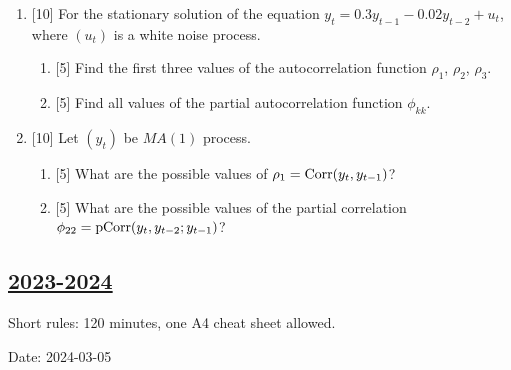 \begin{enumerate}
    \begin{enumerate}
        \item {[5]} Find 95\% confidence for $y_{101}$ given that $y_{100} = 3$ and $y_{99} = 4$.
        \item {[5]} Find 95\% confidence for $y_{102}$ given that $y_{100} = 3$ and $y_{99} = 4$.
    \end{enumerate}
    \item {[10]} For the stationary solution of the equation $y_t = 0.3 y_{t-1} - 0.02 y_{t-2} + u_t$, 
    where $(u_t)$ is a white noise process. 
    \begin{enumerate}
        \item {[5]} Find the first three values of the autocorrelation function $\rho_1$, $\rho_2$, $\rho_3$.
        \item {[5]} Find all values of the partial autocorrelation function $\phi_{kk}$.
    \end{enumerate}

    \item {[10]} Let $(y_t)$ be $MA(1)$ process. 
    \begin{enumerate}
        \item {[5]} What are the possible values of $\rho_1 = \operatorname{Corr}(y_t, y_{t-1})$?
        \item {[5]} What are the possible values of the partial correlation $\phi_{22} = \operatorname{pCorr}(y_t, y_{t-2}; y_{t-1})$?
    \end{enumerate}
\end{enumerate}





\subsection[2023-2024]{\hyperref[sec:sol_kr_03_2023_2024]{2023-2024}}
\label{sec:kr_03_2023_2024} %

Short rules: 120 minutes, one A4 cheat sheet allowed. 

Date: 2024-03-05

